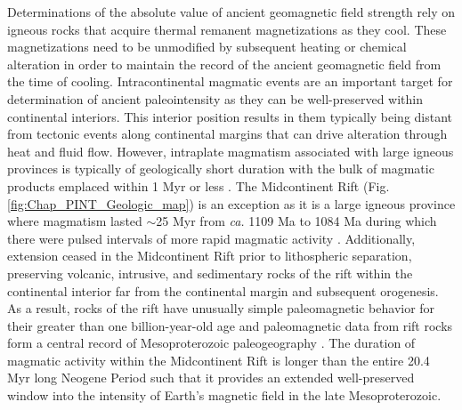 Determinations of the absolute value of ancient geomagnetic field strength rely on igneous rocks that acquire thermal remanent magnetizations as they cool. These magnetizations need to be unmodified by subsequent heating or chemical alteration in order to maintain the record of the ancient geomagnetic field from the time of cooling. Intracontinental magmatic events are an important target for determination of ancient paleointensity as they can be well-preserved within continental interiors. This interior position results in them typically being distant from tectonic events along continental margins that can drive alteration through heat and fluid flow. However, intraplate magmatism associated with large igneous provinces is typically of geologically short duration with the bulk of magmatic products emplaced within 1 Myr or less \citep{Kasbohm2021a}. The Midcontinent Rift (Fig. \ref{fig:Chap_PINT_Geologic_map}) is an exception as it is a large igneous province where magmatism lasted $\sim$25 Myr from \textit{ca.} 1109 Ma to 1084 Ma during which there were pulsed intervals of more rapid magmatic activity \citep{Swanson-Hysell2021a}. Additionally, extension ceased in the Midcontinent Rift prior to lithospheric separation, preserving volcanic, intrusive, and sedimentary rocks of the rift within the continental interior far from the continental margin and subsequent orogenesis. As a result, rocks of the rift have unusually simple paleomagnetic behavior for their greater than one billion-year-old age and paleomagnetic data from rift rocks form a central record of Mesoproterozoic paleogeography \citep{Swanson-Hysell2021c}. The duration of magmatic activity within the Midcontinent Rift is longer than the entire 20.4 Myr long Neogene Period such that it provides an extended well-preserved window into the intensity of Earth's magnetic field in the late Mesoproterozoic. 

